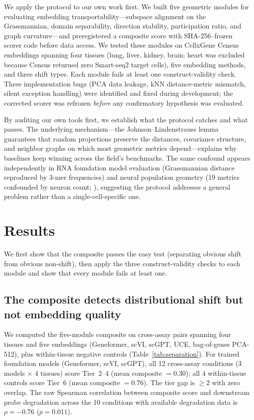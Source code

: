 \documentclass[9pt,lineno]{elife}
\begin{document}
We apply the protocol to our own work first. We built five geometric modules for evaluating embedding transportability---subspace alignment on the Grassmannian, domain separability, direction stability, participation ratio, and graph curvature---and preregistered a composite score with SHA-256--frozen scorer code before data access. We tested these modules on CellxGene Census embeddings spanning four tissues (lung, liver, kidney, brain; heart was excluded because Census returned zero Smart-seq2 target cells), five embedding methods, and three shift types. Each module fails at least one construct-validity check. Three implementation bugs (PCA data leakage, kNN distance-metric mismatch, silent exception handling) were identified and fixed during development; the corrected scorer was refrozen \emph{before} any confirmatory hypothesis was evaluated.

By auditing our own tools first, we establish what the protocol catches and what passes. The underlying mechanism---the Johnson--Lindenstrauss lemma guarantees that random projections preserve the distances, covariance structure, and neighbor graphs on which most geometric metrics depend---explains why baselines keep winning across the field's benchmarks. The same confound appears independently in RNA foundation model evaluation (Grassmannian distance reproduced by 3-mer frequencies) and neural population geometry (19 metrics confounded by neuron count; \citealp{tower2026bracket}), suggesting the protocol addresses a general problem rather than a single-cell-specific one.


\section{Results}

We first show that the composite passes the easy test (separating obvious shift from obvious non-shift), then apply the three construct-validity checks to each module and show that every module fails at least one.

\subsection{The composite detects distributional shift but not embedding quality}

We computed the five-module composite on cross-assay pairs spanning four tissues and five embeddings (Geneformer, scVI, scGPT, UCE, bag-of-genes PCA-512), plus within-tissue negative controls (Table~\ref{tab:separation}). For trained foundation models (Geneformer, scVI, scGPT), all 12 cross-assay conditions (3 models $\times$ 4 tissues) score Tier~2--4 (mean composite $= 0.30$); all 4 within-tissue controls score Tier~6 (mean composite $= 0.76$). The tier gap is $\geq 2$ with zero overlap. The raw Spearman correlation between composite score and downstream probe degradation across the 10 conditions with available degradation data is $\rho = -0.76$ ($p = 0.011$).
\end{document}
